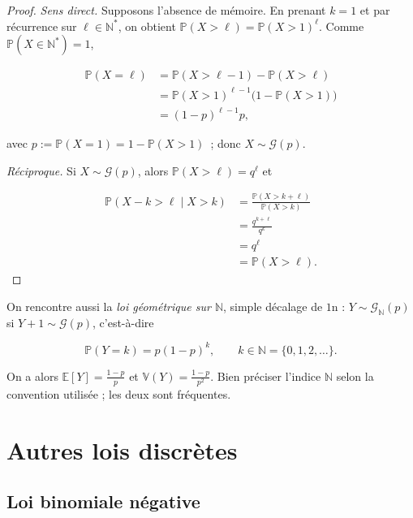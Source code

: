 \begin{proof}
\emph{Sens direct.} Supposons l'absence de mémoire. En prenant $k=1$ et par récurrence sur $\ell\in\mathbb{N}^*$, on obtient $\mathbb{P}(X>\ell)=\mathbb{P}(X>1)^\ell$. Comme $\mathbb{P}(X\in\mathbb{N}^*)=1$,

\begin{align*}
  \mathbb{P}(X=\ell) &=\mathbb{P}(X>\ell-1)-\mathbb{P}(X>\ell) \\
  &=\mathbb{P}(X>1)^{\ell-1}\big(1-\mathbb{P}(X>1)\big) \\
  &=(1-p)^{\ell-1}p,
\end{align*}

avec $p:=\mathbb{P}(X=1)=1-\mathbb{P}(X>1)$~; donc $X\sim\mathcal{G}(p)$.

\medskip

\emph{Réciproque.} Si $X\sim\mathcal{G}(p)$, alors $\mathbb{P}(X>\ell)=q^\ell$ et

\begin{align*}
  \mathbb{P}(X-k>\ell\mid X>k) &=\frac{\mathbb{P}(X>k+\ell)}{\mathbb{P}(X>k)} \\
&=\frac{q^{k+\ell}}{q^k} \\
&=q^\ell \\
&=\mathbb{P}(X>\ell).
\end{align*}
\end{proof}

\begin{remarque}
On rencontre aussi la \emph{loi géométrique sur $\mathbb{N}$}, simple décalage de $1$n : $Y\sim\mathcal{G}_\mathbb{N}(p)$ si $Y+1\sim\mathcal{G}(p)$, c'est-à-dire

$$
  \mathbb{P}(Y=k)=p(1-p)^k,\qquad k\in\mathbb{N}=\{0,1,2,\dots\}.
$$

On a alors $\mathbb{E}[Y]=\frac{1-p}{p}$ et $\mathbb{V}(Y)=\frac{1-p}{p^2}$. Bien préciser l'indice $\mathbb{N}$ selon la convention utilisée ; les deux sont fréquentes.
\end{remarque}

\section{Autres lois discrètes}

\subsection{Loi binomiale négative}

\medskip

